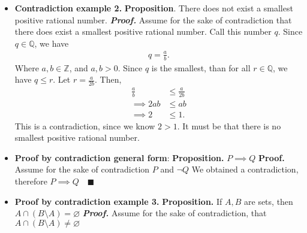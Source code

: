 \documentclass{report}
\begin{document}
\begin{itemize}
        \item \textbf{Contradiction example 2.}
            \bigbreak \noindent 
            \textbf{Proposition}. There does not exist a smallest positive rational number.
            \bigbreak \noindent 
            \textbf{\textit{Proof.}} Assume for the sake of contradiction that there does exist a smallest positive rational number. Call this number $q$. Since $q\in \mathbb{Q}$, we have
            \begin{align*}
                q = \frac{a}{b}
            .\end{align*}
            Where $a,b \in \mathbb{Z}$, and $a,b > 0$. Since $q$ is the smallest, than for all $r \in \mathbb{Q}$, we have $q \leq r$. Let $r = \frac{a}{2b} $. Then,
            \begin{align*}
                \frac{a}{b} &\leq \frac{a}{2b} \\
                \implies 2ab &\leq ab \\
                \implies 2 &\leq 1
            .\end{align*}
            This is a contradiction, since we know $2 > 1$. It must be that there is no smallest positive rational number.
        \item \textbf{Proof by contradiction general form}: 
            \bigbreak \noindent 
            \textbf{Proposition.} $P\implies Q$
            \bigbreak \noindent 
            \textbf{Proof.} Assume for the sake of contradiction $P$ and $\neg Q$
            We obtained a contradiction, therefore $P\implies Q \quad \blacksquare$
        \item \textbf{Proof by contradiction example 3.}
            \bigbreak \noindent 
            \textbf{Proposition.} If $A,B$ are sets, then $A \cap (B \setminus A) = \varnothing $
            \bigbreak \noindent 
            \textbf{\textit{Proof.}} Assume for the sake of contradiction, that $A \cap (B\setminus A) \ne \varnothing $
\end{itemize}
\end{document}
